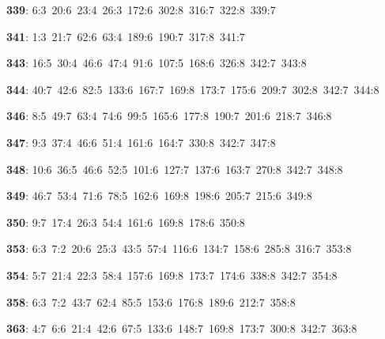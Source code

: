 \noindent \textbf{339}: 6:3\allowbreak\ 20:6\allowbreak\ 23:4\allowbreak\ 26:3\allowbreak\ 172:6\allowbreak\ 302:8\allowbreak\ 316:7\allowbreak\ 322:8\allowbreak\ 339:7\par
\noindent \textbf{341}: 1:3\allowbreak\ 21:7\allowbreak\ 62:6\allowbreak\ 63:4\allowbreak\ 189:6\allowbreak\ 190:7\allowbreak\ 317:8\allowbreak\ 341:7\par
\noindent \textbf{343}: 16:5\allowbreak\ 30:4\allowbreak\ 46:6\allowbreak\ 47:4\allowbreak\ 91:6\allowbreak\ 107:5\allowbreak\ 168:6\allowbreak\ 326:8\allowbreak\ 342:7\allowbreak\ 343:8\par
\noindent \textbf{344}: 40:7\allowbreak\ 42:6\allowbreak\ 82:5\allowbreak\ 133:6\allowbreak\ 167:7\allowbreak\ 169:8\allowbreak\ 173:7\allowbreak\ 175:6\allowbreak\ 209:7\allowbreak\ 302:8\allowbreak\ 342:7\allowbreak\ 344:8\par
\noindent \textbf{346}: 8:5\allowbreak\ 49:7\allowbreak\ 63:4\allowbreak\ 74:6\allowbreak\ 99:5\allowbreak\ 165:6\allowbreak\ 177:8\allowbreak\ 190:7\allowbreak\ 201:6\allowbreak\ 218:7\allowbreak\ 346:8\par
\noindent \textbf{347}: 9:3\allowbreak\ 37:4\allowbreak\ 46:6\allowbreak\ 51:4\allowbreak\ 161:6\allowbreak\ 164:7\allowbreak\ 330:8\allowbreak\ 342:7\allowbreak\ 347:8\par
\noindent \textbf{348}: 10:6\allowbreak\ 36:5\allowbreak\ 46:6\allowbreak\ 52:5\allowbreak\ 101:6\allowbreak\ 127:7\allowbreak\ 137:6\allowbreak\ 163:7\allowbreak\ 270:8\allowbreak\ 342:7\allowbreak\ 348:8\par
\noindent \textbf{349}: 46:7\allowbreak\ 53:4\allowbreak\ 71:6\allowbreak\ 78:5\allowbreak\ 162:6\allowbreak\ 169:8\allowbreak\ 198:6\allowbreak\ 205:7\allowbreak\ 215:6\allowbreak\ 349:8\par
\noindent \textbf{350}: 9:7\allowbreak\ 17:4\allowbreak\ 26:3\allowbreak\ 54:4\allowbreak\ 161:6\allowbreak\ 169:8\allowbreak\ 178:6\allowbreak\ 350:8\par
\noindent \textbf{353}: 6:3\allowbreak\ 7:2\allowbreak\ 20:6\allowbreak\ 25:3\allowbreak\ 43:5\allowbreak\ 57:4\allowbreak\ 116:6\allowbreak\ 134:7\allowbreak\ 158:6\allowbreak\ 285:8\allowbreak\ 316:7\allowbreak\ 353:8\par
\noindent \textbf{354}: 5:7\allowbreak\ 21:4\allowbreak\ 22:3\allowbreak\ 58:4\allowbreak\ 157:6\allowbreak\ 169:8\allowbreak\ 173:7\allowbreak\ 174:6\allowbreak\ 338:8\allowbreak\ 342:7\allowbreak\ 354:8\par
\noindent \textbf{358}: 6:3\allowbreak\ 7:2\allowbreak\ 43:7\allowbreak\ 62:4\allowbreak\ 85:5\allowbreak\ 153:6\allowbreak\ 176:8\allowbreak\ 189:6\allowbreak\ 212:7\allowbreak\ 358:8\par
\noindent \textbf{363}: 4:7\allowbreak\ 6:6\allowbreak\ 21:4\allowbreak\ 42:6\allowbreak\ 67:5\allowbreak\ 133:6\allowbreak\ 148:7\allowbreak\ 169:8\allowbreak\ 173:7\allowbreak\ 300:8\allowbreak\ 342:7\allowbreak\ 363:8\par
